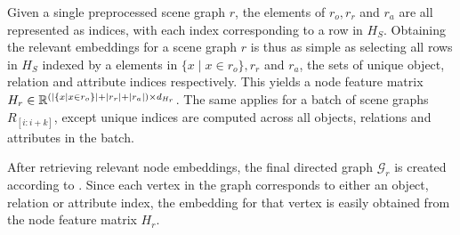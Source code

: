 Given a single preprocessed scene graph \(r\), the elements of \(r_o, r_r\) and \(r_a\) are all represented as indices, with each index corresponding to a row in \(H_S\). Obtaining the relevant embeddings for a scene graph \(r\) is thus as simple as selecting all rows in \(H_S\) indexed by a elements in \(\{x \mid x \in r_o\}, r_r\) and \(r_a\), the sets of unique object, relation and attribute indices respectively. This yields a node feature matrix \(H_r \in \mathbb{R}^{(|\{x \mid x \in r_o\}| + |r_r| + |r_a|) \times d_{H_r}}\). The same applies for a batch of scene graphs \(R_{[i:i+k]}\), except unique indices are computed across all objects, relations and attributes in the batch.

After retrieving relevant node embeddings, the final directed graph \(\mathcal{G}_r\) is created according to \algorithmcfname{ \ref{algorithm:scene_graph_construction}}. Since each vertex in the graph corresponds to either an object, relation or attribute index, the embedding for that vertex is easily obtained from the node feature matrix \(H_r\).

